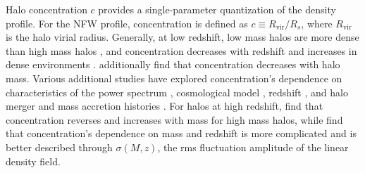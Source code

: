 Halo concentration $c$ provides a single-parameter quantization of the density profile.  For the NFW profile, concentration is defined as $c \equiv R_{\mathrm{vir}} / R_{s}$, where $R_{\mathrm{vir}}$ is the halo virial radius.  Generally, at low redshift, low mass halos are more dense than high mass halos \citep{1997ApJ...490..493N}, and concentration decreases with redshift and increases in dense environments \citep{2001MNRAS.321..559B}.  \citet{2007MNRAS.381.1450N} additionally find that concentration decreases with halo mass.  Various additional studies have explored concentration's dependence on characteristics of the power spectrum \citep{2001ApJ...554..114E}, cosmological model \citep{2008MNRAS.391.1940M}, redshift \citep{2008MNRAS.387..536G, 2011MNRAS.411..584M}, and halo merger and mass accretion histories \citep{2002ApJ...568...52W, 2003MNRAS.339...12Z, 2009ApJ...707..354Z}.  For halos at high redshift, \citet{2011ApJ...740..102K} find that concentration reverses and increases with mass for high mass halos, while \citet{2012MNRAS.423.3018P} find that concentration's dependence on mass and redshift is more complicated and is better described through $\sigma(M,z)$, the rms fluctuation amplitude of the linear density field.


